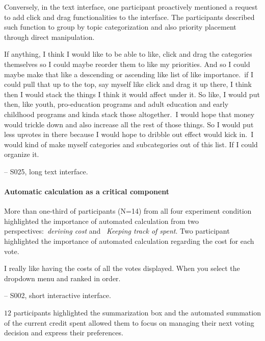 Conversely, in the text interface, one participant proactively mentioned a request to add click and drag functionalities to the interface. The participants described such function to group by topic categorization and also priority placement through direct manipulation. 

\begin{displayquote}
If anything, I think I would like to be able to like, click and drag the categories themselves so I could maybe reorder them to like my priorities. And so I could maybe make that like a descending or ascending like list of like importance.~\bracketellipsis if I could pull that up to the top, say myself like click and drag it up there, I think then I would stack the things I think it would affect under it. So like, I would put then, like youth, pro-education programs and adult education and early childhood programs and kinda stack those altogether.~\bracketellipsis I would hope that money would trickle down and also increase all the rest of those things. So I would put less upvotes in there because I would hope to dribble out effect would kick in.~\bracketellipsis I would kind of make myself categories and subcategories out of this list. If I could organize it.

\noindent \hfill -- S025, long text interface.
\end{displayquote}

\paragraph{Automatic calculation as a critical component}
More than one-third of participants (N=14) from all four experiment condition highlighted the importance of automated calculation from two perspectives:~\textit{deriving cost} and ~\textit{Keeping track of spent}. Two participant highlighted the importance of automated calculation regarding the cost for each vote.

\begin{displayquote}
I really like having the costs of all the votes displayed. When you select the dropdown menu and ranked in order.

\noindent \hfill -- S002, short interactive interface.
\end{displayquote}

$12$ participants highlighted the summarization box and the automated summation of the current credit spent allowed them to focus on managing their next voting decision and express their preferences.


